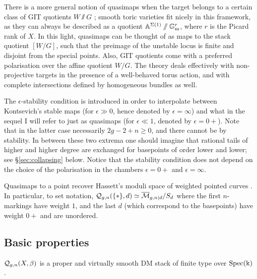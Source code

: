 \begin{rmk}
 There is a more general notion of quasimaps when the target belongs to a certain class of GIT quotients $W\sslash G$ \cite{CFKM}; smooth toric varieties fit nicely in this framework, as they can always be described as a quotient $\mathbb{A}^{\Sigma(1)}\sslash\mathbb{G}_{\text{m}}^r$, where $r$ is the Picard rank of $X$. In this light, quasimaps can be thought of as maps to the stack quotient $[W/G]$, such that the preimage of the unstable locus is finite and disjoint from the special points. Also, GIT quotients come with a preferred polarisation over the affine quotient $W/G$. The theory deals effectively with non-projective targets in the presence of a well-behaved torus action, and with complete intersections defined by homogeneous bundles as well.
\end{rmk}
\begin{rmk}
 The $\epsilon$-stability condition is introduced in order to interpolate between Kontsevich's stable maps (for $\epsilon\gg 0$, hence denoted by $\epsilon=\infty$) and what in the sequel I will refer to just as quasimaps (for $\epsilon\ll1$, denoted by $\epsilon=0+$). Note that in the latter case necessarily $2g-2+n \geq 0$, and there cannot be  by stability. In between these two extrema one should imagine that rational tails of higher and higher degree are exchanged for basepoints of order lower and lower; see \S \ref{sec:collapsing} below. Notice that the stability condition does not depend on the choice of the polarisation in the chambers $\epsilon=0+$ \cite[Lemma 3.1.3]{CF-K} and $\epsilon=\infty$.
\end{rmk}

\begin{ex}\label{ex:qm_to_pt}
 Quasimaps to a point recover Hassett's moduli space of weighted pointed curves \cite{Hassett}. In particular, to set notation, $\mathcal{Q}_{g,n}(\{*\},d)\simeq \overline{\mathcal{M}}_{g,n|d}/S_d$ where the first $n$-markings have weight $1$, and the last $d$ (which correspond to the basepoints) have weight $0+$ and are unordered.
\end{ex}

\subsection{Basic properties}\begin{thm}\cite[Theorems 3.2.1 and 4.0.1]{CF-K}
 $\mathcal{Q}_{g,n}(X,\beta)$ is a proper and virtually smooth DM stack of finite type over $\operatorname{Spec}(\Bbbk)$.
\end{thm}

